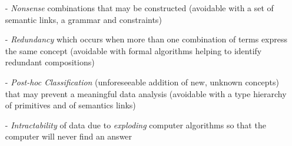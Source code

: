 \begin{itemize}
    \item[-] \emph{Nonsense} combinations that may be constructed
        (avoidable with a set of semantic links, a grammar and constraints)
    \item[-] \emph{Redundancy} which occurs when more than one combination of
        terms express the same concept
        (avoidable with formal algorithms helping to identify redundant compositions)
    \item[-] \emph{Post-hoc Classification} (unforeseeable addition of new,
        unknown concepts) that may prevent a meaningful data analysis
        (avoidable with a type hierarchy of primitives and of semantics links)
    \item[-] \emph{Intractability} of data due to \emph{exploding} computer
        algorithms so that the computer will never find an answer
\end{itemize}
